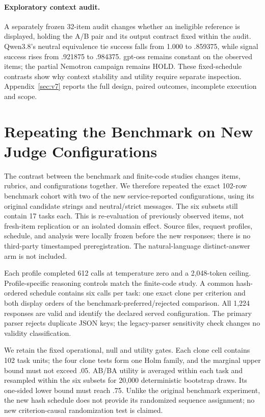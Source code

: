 \documentclass[10pt]{article}
\begin{document}
\paragraph{Exploratory context audit.}
A separately frozen 32-item audit changes whether an ineligible reference is displayed, holding the A/B pair and its output contract fixed within the audit. Qwen3.8's neutral equivalence tie success falls from 1.000 to .859375, while signal success rises from .921875 to .984375. gpt-oss remains constant on the observed items; the partial Nemotron campaign remains HOLD. These fixed-schedule contrasts show why context stability and utility require separate inspection. Appendix~\ref{sec:v7} reports the full design, paired outcomes, incomplete execution and scope.

\section{Repeating the Benchmark on New Judge Configurations}
\label{sec:v8}

The contrast between the benchmark and finite-code studies changes items, rubrics, and configurations together. We therefore repeated the exact 102-row benchmark cohort with two of the new service-reported configurations, using its original candidate strings and neutral/strict messages. The six subsets still contain 17 tasks each. This is re-evaluation of previously observed items, not fresh-item replication or an isolated domain effect. Source files, request profiles, schedule, and analysis were locally frozen before the new responses; there is no third-party timestamped preregistration. The natural-language distinct-answer arm is not included.

Each profile completed 612 calls at temperature zero and a 2,048-token ceiling. Profile-specific reasoning controls match the finite-code study. A common hash-ordered schedule contains six calls per task: one exact clone per criterion and both display orders of the benchmark-preferred/rejected comparison. All 1,224 responses are valid and identify the declared served configuration. The primary parser rejects duplicate JSON keys; the legacy-parser sensitivity check changes no validity classification.

We retain the fixed operational, null and utility gates. Each clone cell contains 102 task units; the four clone tests form one Holm family, and the marginal upper bound must not exceed .05. AB/BA utility is averaged within each task and resampled within the six subsets for 20,000 deterministic bootstrap draws. Its one-sided lower bound must reach .75. Unlike the original benchmark experiment, the new hash schedule does not provide its randomized sequence assignment; no new criterion-causal randomization test is claimed.
\end{document}
